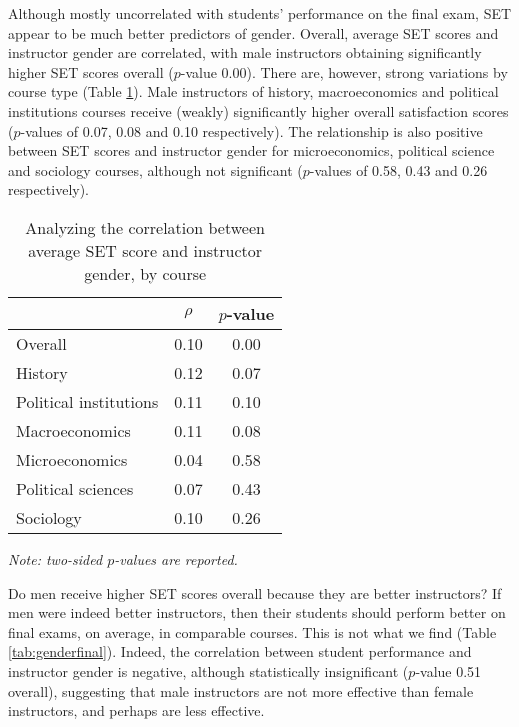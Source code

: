 \documentclass[12pt]{article}
\begin{document}
Although mostly uncorrelated with students' performance on the final exam, SET appear to be much better predictors of gender. Overall, average SET scores and instructor gender are correlated, with male instructors obtaining significantly higher SET scores overall ($p$-value 0.00). There are, however, strong variations by course type (Table \ref{tab:instructorgender}). Male instructors of history, macroeconomics and political institutions courses receive (weakly) significantly higher overall satisfaction scores ($p$-values of 0.07, 0.08 and 0.10 respectively). The relationship is also positive between SET scores and instructor gender for microeconomics, political science and sociology courses, although not significant ($p$-values of 0.58, 0.43 and 0.26 respectively).   

\begin{table}[htbp]
  \centering
  \footnotesize 
  \caption{Analyzing the correlation between average SET score and instructor gender, by course}
    \begin{tabular}{lcc}
    \toprule 
                          & $\rho$  & $p$-value     \\
   \midrule
    Overall &                 0.10       & 0.00     \\
    History &                 0.12       & 0.07     \\
    Political institutions &  0.11       & 0.10     \\
    Macroeconomics &          0.11       & 0.08     \\
    Microeconomics &          0.04       & 0.58     \\
    Political sciences &      0.07       & 0.43     \\
    Sociology &               0.10       & 0.26     \\
    \bottomrule
    \end{tabular}%
 \label{tab:instructorgender}%
  
  \textit{Note: two-sided $p$-values are reported.}
\end{table}%
\normalsize


Do men receive higher SET scores overall because they are better instructors? 
If men were indeed better instructors, then their students should perform better on final exams, on average,
in comparable courses. 
This is not what we find (Table \ref{tab:genderfinal}). 
Indeed, the correlation between student performance and instructor gender is negative, although statistically insignificant ($p$-value 0.51 overall), suggesting that male instructors are not more effective
than female instructors, and perhaps are less effective. 
\end{document}
